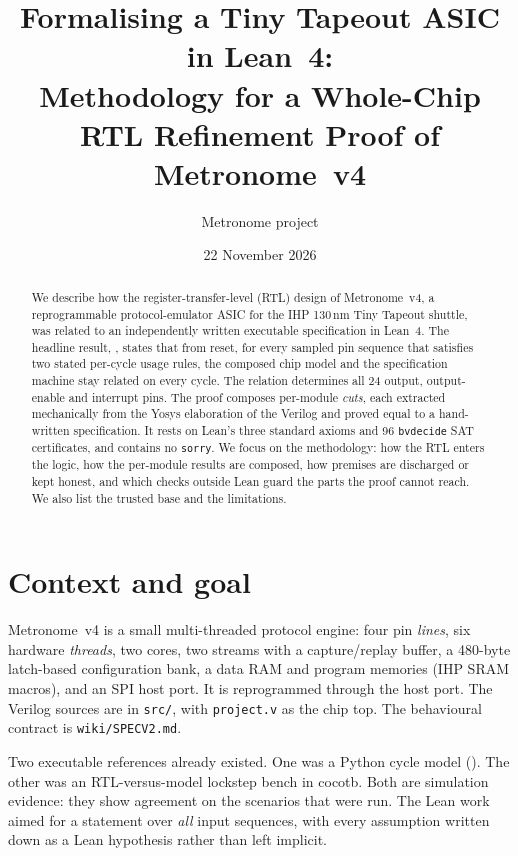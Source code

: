 \documentclass[11pt,a4paper]{article}
\title{Formalising a Tiny Tapeout ASIC in Lean~4:\\
  Methodology for a Whole-Chip RTL Refinement Proof of Metronome~v4}
\author{Metronome project}
\date{22 November 2026}
\newcommand{\brkus}{\textunderscore\allowbreak}
\newcommand{\code}[1]{{\let\_\brkus\texttt{#1}}}
\newcommand{\lean}[1]{\texttt{\detokenize{#1}}}
\begin{document}
\maketitle

\begin{abstract}
We describe how the register-transfer-level (RTL) design of Metronome~v4, a
reprogrammable protocol-emulator ASIC for the IHP 130\,nm Tiny Tapeout shuttle,
was related to an independently written executable specification in Lean~4.
The headline result, \lean{trace_refines'}, states that from reset, for every
sampled pin sequence that satisfies two stated per-cycle usage rules, the
composed chip model and the specification machine stay related on every cycle.
The relation determines all 24 output, output-enable and interrupt pins. The
proof composes per-module \emph{cuts}, each extracted mechanically from the
Yosys elaboration of the Verilog and proved equal to a hand-written
specification. It rests on Lean's three standard axioms and 96 \code{bv\_decide}
SAT certificates, and contains no \code{sorry}. We focus on the methodology:
how the RTL enters the logic, how the per-module results are composed, how
premises are discharged or kept honest, and which checks outside Lean guard the
parts the proof cannot reach. We also list the trusted base and the limitations.
\end{abstract}

\tableofcontents

\section{Context and goal}

Metronome~v4 is a small multi-threaded protocol engine: four pin \emph{lines},
six hardware \emph{threads}, two cores, two streams with a capture/replay
buffer, a 480-byte latch-based configuration bank, a data RAM and program
memories (IHP SRAM macros), and an SPI host port. It is reprogrammed through
the host port. The Verilog sources are in \code{src/}, with \code{project.v}
as the chip top. The behavioural contract is \code{wiki/SPEC\_V2.md}.

Two executable references already existed. One was a Python cycle model
(). The other was an RTL-versus-model lockstep
bench in cocotb. Both are simulation evidence: they show agreement on the
scenarios that were run. The Lean work aimed for a statement over
\emph{all} input sequences, with every assumption written down as a Lean
hypothesis rather than left implicit.
\end{document}
